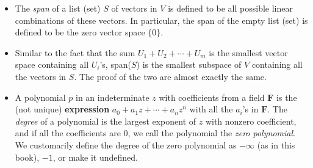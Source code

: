 \documentclass[11pt]{article}
\newcommand{\df}[1]{\textit{\textsf{#1}}}
\newcommand{\F}{\mathbf{F}}
\begin{document}
\begin{itemize}
    \item The \df{span} of a list (set) $S$ of vectors in $V$ is defined to be all possible linear combinations of these vectors. In particular, the span of the empty list (set) is defined to be the zero vector space $\{0\}$.
    \item Similar to the fact that the sum $U_1 + U_2 +\cdots+ U_m$ is the smallest vector space containing all $U_i$'s, span($S$) is the smallest subspace of $V$ containing all the vectors in $S$. The proof of the two are almost exactly the same.
    \item A polynomial $p$ in an indeterminate $z$ with coefficients from a field $\F$ is the (not unique) \textbf{expression} $a_0 + a_1 z + \cdots + a_n z^n$ with all the $a_i$'s in $\F$. The \df{degree} of a polynomial is the largest exponent of $z$ with nonzero coefficient, and if all the coefficients are 0, we call the polynomial the \df{zero polynomial}. We customarily define the degree of the zero polynomial as $-\infty$ (as in this book), $-1$, or make it undefined.
    

\end{itemize}
\end{document}
